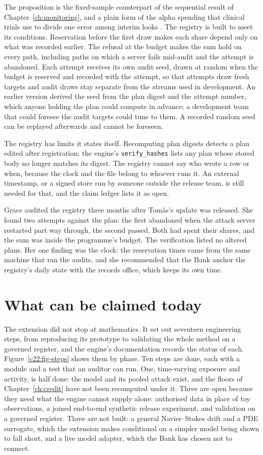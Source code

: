The proposition is the fixed-sample counterpart of the sequential result of Chapter~\ref{ch:monitoring}, and a plain
form of the alpha spending that clinical trials use to divide one error among interim looks
\citep{lan1983}. The registry is built to meet its conditions. Reservation before the first draw
makes each share depend only on what was recorded earlier. The refusal at the budget makes the sum
hold on every path, including paths on which a server fails mid-audit and the attempt is
abandoned. Each attempt receives its own audit seed, drawn at random when the budget is reserved
and recorded with the attempt, so that attempts draw fresh targets and audit draws stay separate
from the streams used in development. An earlier version derived the seed from the plan digest and
the attempt number, which anyone holding the plan could compute in advance; a development team that
could foresee the audit targets could tune to them. A recorded random seed can be replayed
afterwards and cannot be foreseen.

The registry has limits it states itself. Recomputing plan digests detects a plan edited after
registration; the engine's \texttt{verify\_hashes} lists any plan whose stored body no longer matches
its digest. The registry cannot say who wrote a row or when, because the clock and the file belong
to whoever runs it. An external timestamp, or a signed store run by someone outside the release
team, is still needed for that, and the claim ledger lists it as open.

Grace audited the registry three months after Tom\'as's update was released. She found two attempts
against the plan: the first abandoned when the attack server restarted part way through, the
second passed. Both had spent their shares, and the sum was inside the programme's budget. The
verification listed no altered plans. Her one finding was the clock: the reservation times came
from the same machine that ran the audits, and she recommended that the Bank anchor the registry's
daily state with the records office, which keeps its own time.

\section{What can be claimed today}\label{c22:sec-claims}

The extension did not stop at mathematics. It set out seventeen engineering steps, from
reproducing its prototype to validating the whole method on a governed register, and the engine's
documentation records the status of each. Figure~\ref{c22:fig-steps} shows them by phase. Ten steps are done,
each with a module and a test that an auditor can run. One, time-varying exposure and activity, is
half done: the model and its pooled attack exist, and the floors of Chapter~\ref{ch:credit} have not been
recomputed under it. Three are open because they need what the engine cannot supply alone:
authorised data in place of toy observations, a joined end-to-end synthetic release experiment,
and validation on a governed register. Three are not built: a general Navier--Stokes drift and a
PDE surrogate, which the extension makes conditional on a simpler model being shown to fall short,
and a live model adapter, which the Bank has chosen not to connect.

